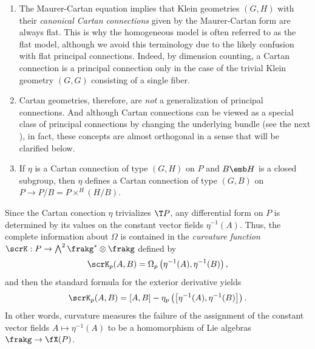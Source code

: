 \begin{example}
    \begin{enumerate}
        \item The Maurer-Cartan equation implies that Klein geometries $(G,H)$ with their \emph{canonical Cartan connections} given by the Maurer-Cartan form are always flat. This is why the homogeneous model is often referred to as the flat model, although we avoid this terminology due to the likely confusion with flat principal connections. Indeed, by dimension counting, a Cartan connection is a principal connection only in the case of the trivial Klein geometry $(G,G)$ consisting of a single fiber.
        \item Cartan geometries, therefore, are \emph{not} a generalization of principal connections. And although Cartan connections can be viewed as a special class of principal connections by changing the underlying bundle (see the next \sect), in fact, these concepts are almost orthogonal in a sense that will be clarified below.
        \item If $\eta$ is a Cartan connection of type $(G,H)$ on $P$ and $B\emb H$ is a closed subgroup, then $\eta$ defines a Cartan connection of type $(G,B)$ on $P\to P\slash B= P\times^H (H\slash B)$.\label{xca V.3.6 Sharpe}
    \end{enumerate}
\end{example}


Since the Cartan conection $\eta$ trivializes $\T P$, any differential form on $P$ is determined by its values on the constant vector fields $\eta^{-1}(A)$. Thus, the complete information about $\Omega$ is contained in the \emph{curvature function} $\scrK:P\to \bigwedge\nolimits^2\frakg^\ast\otimes\frakg$ defined by 
\[\scrK_p(A,B)=\Omega_p\left(\eta^{-1}(A),\eta^{-1}(B)\right),\]
and then the standard formula for the exterior derivative yields 
\[\scrK_p(A,B)=[A,B]-\eta_p\left(\left[\eta^{-1}(A),\eta^{-1}(B)\right]\right).\]
In other words, curvature measures the failure of the assignment of the constant vector fields $A\mapsto \eta^{-1}(A)$ to be a homomorphism of Lie algebras $\frakg\to \fX(P)$.


